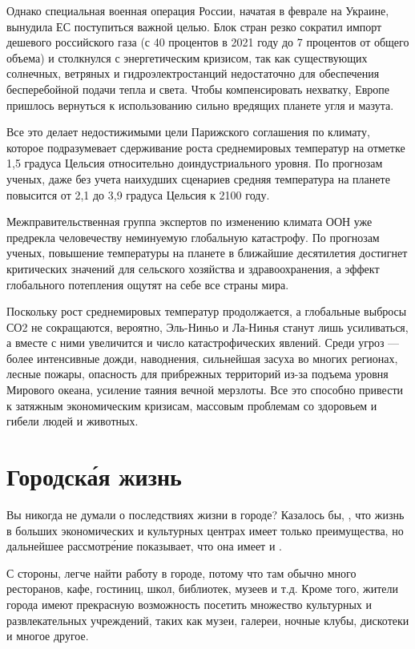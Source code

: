 Однако специальная военная операция России, начатая в феврале на Украине, вынудила ЕС поступиться важной целью. Блок стран резко сократил импорт дешевого российского газа (с 40 процентов в 2021 году до 7 процентов от общего объема) и столкнулся с энергетическим кризисом, так как существующих солнечных, ветряных и гидроэлектростанций недостаточно для обеспечения бесперебойной подачи тепла и света. Чтобы компенсировать нехватку, Европе пришлось вернуться к использованию сильно вредящих планете угля и мазута.

Все это делает недостижимыми цели Парижского соглашения по климату, которое подразумевает сдерживание роста среднемировых температур на отметке 1,5 градуса Цельсия относительно доиндустриального уровня. По прогнозам ученых, даже без учета наихудших сценариев средняя температура на планете повысится от 2,1 до 3,9 градуса Цельсия к 2100 году.

Межправительственная группа экспертов по изменению климата ООН уже предрекла человечеству неминуемую глобальную катастрофу. По прогнозам ученых, повышение температуры на планете в ближайшие десятилетия достигнет критических значений для сельского хозяйства и здравоохранения, а эффект глобального потепления ощутят на себе все страны мира.

Поскольку рост среднемировых температур продолжается, а глобальные выбросы СО2 не сокращаются, вероятно, Эль-Ниньо и Ла-Нинья станут лишь усиливаться, а вместе с ними увеличится и число катастрофических явлений. Среди угроз — более интенсивные дожди, наводнения, сильнейшая засуха во многих регионах, лесные пожары, опасность для прибрежных территорий из-за подъема уровня Мирового океана, усиление таяния вечной мерзлоты. Все это способно привести к затяжным экономическим кризисам, массовым проблемам со здоровьем и гибели людей и животных.

\newpage
\section{Городск\'{а}я жизнь}
Вы никогда не думали о последствиях жизни в городе? Казалось бы, , что жизнь в больших экономических и культурных центрах имеет только преимущества, но дальнейшее рассмотр\'{е}ние показывает, что она имеет и .

С  стороны, легче найти работу в городе, потому что там обычно много ресторанов, кафе, гостиниц, школ, библиотек, музеев и т.д. Кроме того, жители города имеют прекрасную возможность посетить множество культурных и развлекательных учреждений, таких как музеи, галереи, ночные клубы, дискотеки и многое другое.

